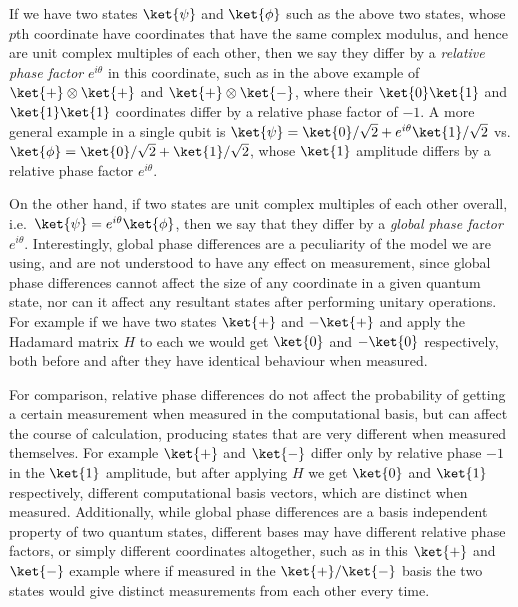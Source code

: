 If we have two states $\ket{\psi}$ and $\ket{\phi}$ such as the above two states, whose $p$th coordinate have coordinates that have the same complex modulus, and hence are unit complex multiples of each other, then we say they differ by a \emph{relative phase factor} $e^{i\theta}$ in this coordinate, such as in the above example of $\ket{+}\otimes \ket{+}$ and $\ket{+}\otimes \ket{-}$, where their $\ket{0}\ket{1}$ and $\ket{1}\ket{1}$ coordinates differ by a relative phase factor of $-1$. A more general example in a single qubit is $\ket{\psi} = \ket{0}/\sqrt{2} + e^{i\theta}\ket{1}/\sqrt{2}$ vs. $\ket{\phi} = \ket{0}/\sqrt{2} + \ket{1}/\sqrt{2}$, whose $\ket{1}$ amplitude differs by a relative phase factor $e^{i\theta}$.

On the other hand, if two states are unit complex multiples of each other overall, i.e.\ $\ket{\psi} = e^{i\theta}\ket{\phi}$, then we say that they differ by a \emph{global phase factor} $e^{i\theta}$. Interestingly, global phase differences are a peculiarity of the model we are using, and are not understood to have any effect on measurement, since global phase differences cannot affect the size of any coordinate in a given quantum state, nor can it affect any resultant states after performing unitary operations. For example if we have two states $\ket{+}$ and $-\ket{+}$ and apply the Hadamard matrix $H$ to each we would get $\ket{0}$ and $-\ket{0}$ respectively, both before and after they have identical behaviour when measured.

For comparison, relative phase differences do not affect the probability of getting a certain measurement when measured in the computational basis, but can affect the course of calculation, producing states that are very different when measured themselves. For example $\ket{+}$ and $\ket{-}$ differ only by relative phase $-1$ in the $\ket{1}$ amplitude, but after applying $H$ we get $\ket{0}$ and $\ket{1}$ respectively, different computational basis vectors, which are distinct when measured. Additionally, while global phase differences are a basis independent property of two quantum states, different bases may have different relative phase factors, or simply different coordinates altogether, such as in this $\ket{+}$ and $\ket{-}$ example where if measured in the $\ket{+}/\ket{-}$ basis the two states would give distinct measurements from each other every time.

